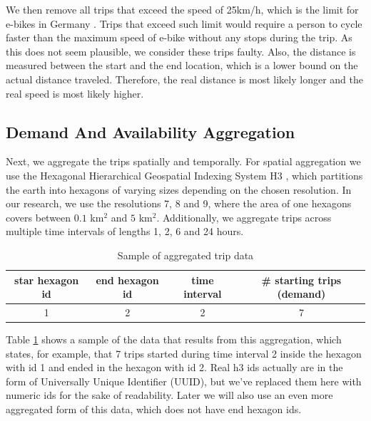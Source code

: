 We then remove all trips that exceed the speed of 25km/h, which is the limit for e-bikes in Germany . Trips that exceed such limit would require a person to cycle faster than the maximum speed of e-bike without any stops during the trip. As this does not seem plausible, we consider these trips faulty.
Also, the distance is measured between the start and the end location, which is a lower bound on the actual distance traveled.
Therefore, the real distance is most likely longer and the real speed is most likely higher.

\subsection{Demand And Availability Aggregation}
Next, we aggregate the trips spatially and temporally.
For spatial aggregation we use the Hexagonal Hierarchical Geospatial Indexing System H3 , which partitions the earth into hexagons of varying sizes depending on the chosen resolution.
In our research, we use the resolutions 7, 8 and 9, where the area of one hexagons covers between \(0.1\) km\(^2\) and \(5\) km\(^2\).
Additionally, we aggregate trips across multiple time intervals of lengths 1, 2, 6 and 24 hours.


\begin{table}[h!]
    \centering
    \begin{tabular}{ c|c|c|c }
        star hexagon id & end hexagon id & time interval & \# starting trips (demand) \\
        \hline
        1               & 2              & 2             & 7                          \\
    \end{tabular}
    \caption{Sample of aggregated trip data}
    \label{table:aggregated_trips}
\end{table}

Table \ref{table:aggregated_trips} shows a sample of the data that results from this aggregation, which states, for example, that 7 trips started during time interval 2 inside the hexagon with id 1 and ended in the hexagon with id 2.
Real h3 ids actually are in the form of Universally Unique Identifier (UUID), but we've replaced them here with numeric ids for the sake of readability.
Later we will also use an even more aggregated form of this data, which does not have end hexagon ids.



